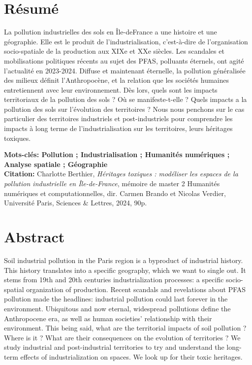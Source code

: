 \documentclass[a4paper,twoside,12pt]{book}
\begin{document}
\section*{Résumé}

La pollution industrielles des sols en Île-deFrance a une histoire et une géographie. Elle est le produit de l'industrialisation, c'est-à-dire de l'organisation socio-spatiale de la production aux XIXe et XXe siècles. Les scandales et mobilisations politiques récents au sujet des PFAS, polluants éternels, ont agité l'actualité en 2023-2024. Diffuse et maintenant éternelle, la pollution généralisée des milieux définit l'Anthropocène, et la relation que les sociétés humaines entretiennent avec leur environnement.  Dès lors, quels sont les impacts territoriaux de la pollution des sols ? Où se manifeste-t-elle ? Quels impacts a la pollution des sols sur l'évolution des territoires ? Nous nous penchons sur le cas particulier des territoires industriels et post-industriels pour comprendre les impacts à long terme de l'industrialisation sur les territoires, leurs héritages toxiques.  

\medskip

\textbf{Mots-clés: Pollution ; Industrialisation ; Humanités numériques ; Analyse spatiale ; Géographie} \\

\textbf{Citation:} Charlotte Berthier, \textit{Héritages toxiques : modéliser les espaces de la pollution industrielle en Île-de-France}, mémoire de master 2 \og Humanités numériques et computationnelles\fg{}, dir. Carmen Brando et Nicolas Verdier, Université Paris, Sciences \& Lettres, 2024, 90p.

\section*{Abstract}

Soil industrial pollution in the Paris region is a byproduct of industrial history. This history translates into a specific geography, which we want to single out. It stems from 19th and 20th centuries industrialization processes: a specific socio-spatial organization of production. Recent scandals and revelations about PFAS pollution made the headlines: industrial pollution could last forever in the environment. Ubiquitous and now eternal,  widespread pollutions define the Anthropocene era, as well as human societies' relationship with their environment. This being said, what are the territorial impacts of soil pollution ? Where is it ? What are their  consequences on the evolution of territories ? We study  industrial and post-industrial territories to try and understand the long-term effects of industrialization on spaces. We look up for their toxic heritages.     
\end{document}
